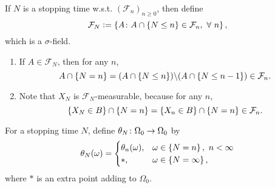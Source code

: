 \begin{defn}
    If $N$ is a stopping time w.s.t. $(\mathcal{F}_n)_{n \geq 0}$, then define
    \begin{equation*}
        \mathcal{F}_N \vcentcolon= \left\{A \colon A \cap \left\{N \leq n\right\} \in \mathcal{F}_n,~\forall~n\right\},
    \end{equation*}
    which is a $\sigma$-field.
\end{defn}
\begin{rmk}
    \begin{enumerate}[label=(\arabic{*})]
        \item If $A \in \mathcal{F}_N$, then for any $n$,
        \begin{equation*}
            A \cap \left\{N = n\right\} = (A \cap \left\{N \leq n\right\}) \backslash (A \cap \left\{N \leq n-1\right\}) \in \mathcal{F}_n.
        \end{equation*}
        \item Note that $X_N$ is $\mathcal{F}_N$-measurable, because for any $n$,
        \begin{equation*}
            \left\{X_N \in B\right\} \cap \left\{N = n\right\} = \left\{X_n \in B\right\} \cap \left\{N = n\right\} \in \mathcal{F}_n.
        \end{equation*}
    \end{enumerate}
\end{rmk}

\noindent For a stopping time $N$, define $\theta_N \colon \Omega_0 \rightarrow \Omega_0$ by
\begin{equation*}
    \theta_N(\omega) = \begin{cases}
        \theta_n(\omega),& \omega \in \left\{N = n\right\},~n<\infty \\
        *,& \omega \in \left\{N = \infty\right\},
    \end{cases}
\end{equation*}
where $*$ is an extra point adding to $\Omega_0$.

